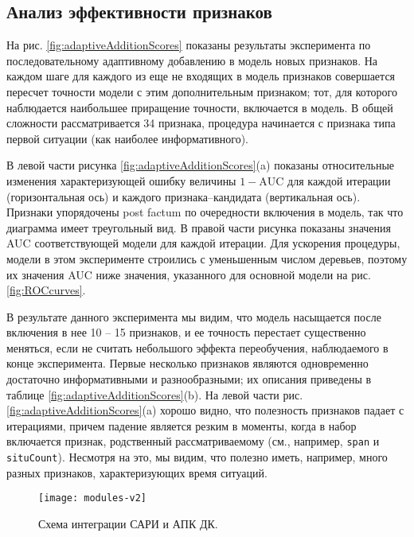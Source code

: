 \subsection{Анализ эффективности признаков}\label{sec:greedy}
На рис. \ref{fig:adaptiveAdditionScores} показаны результаты эксперимента по последовательному адаптивному добавлению в модель новых признаков. На каждом шаге для каждого из еще не входящих в модель признаков совершается пересчет точности модели с этим дополнительным признаком; тот, для которого наблюдается наибольшее приращение точности, включается в модель. В общей сложности рассматривается 34 признака, процедура начинается с признака типа первой ситуации (как наиболее информативного). 

В левой части рисунка \ref{fig:adaptiveAdditionScores}(a) показаны относительные изменения характеризующей ошибку величины $1-\text{AUC}$ для каждой итерации (горизонтальная ось) и каждого признака--кандидата (вертикальная ось). Признаки упорядочены post factum по очередности включения в модель, так что диаграмма имеет треугольный вид. В правой части рисунка показаны значения AUC соответствующей модели для каждой итерации. Для ускорения процедуры, модели в этом эксперименте строились с уменьшенным числом деревьев, поэтому их значения AUC ниже значения, указанного для основной модели на рис. \ref{fig:ROCcurves}. 

В результате данного эксперимента мы видим, что модель насыщается после включения в нее 10 -- 15 признаков, и ее точность перестает существенно меняться, если не считать небольшого эффекта переобучения, наблюдаемого в конце эксперимента. Первые несколько признаков являются одновременно достаточно информативными и разнообразными; их описания приведены в таблице \ref{fig:adaptiveAdditionScores}(b). На левой части рис. \ref{fig:adaptiveAdditionScores}(a) хорошо видно, что полезность признаков падает с итерациями, причем падение является резким в моменты, когда в набор включается признак, родственный рассматриваемому (см., например, \texttt{span} и \texttt{situCount}). Несмотря на это, мы видим, что полезно иметь, например, много разных признаков, характеризующих время ситуаций.


\begin{figure}[thb] 
\centering
\texttt{[image: modules-v2]}
\centering
\caption{Схема интеграции САРИ и АПК ДК.}
\centering
\label{fig:modules}
\end{figure}


